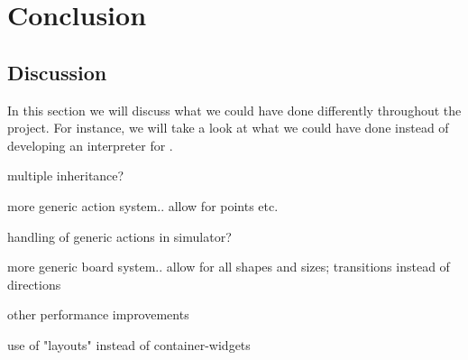 \chapter{Conclusion}
\label{chap:conclusion}
 
\section{Discussion}
\label{sec:discussion}

In this section we will discuss what we could have done differently throughout
the project. For instance, we will take a look at what we could have done
instead of developing an interpreter for \productname{}.












multiple inheritance?

more generic action system.. allow for points etc.

handling of generic actions in simulator?

more generic board system.. allow for all shapes and sizes; transitions instead
of directions

other performance improvements

use of "layouts" instead of container-widgets